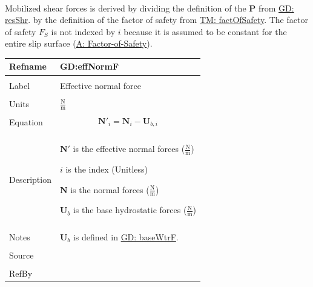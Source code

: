 \documentclass[12pt]{article}
\begin{document}
\paragraph{}
\label{GD:mobShrDeriv}
Mobilized shear forces is derived by dividing the definition of the $\mathbf{P}$ from \hyperref[GD:resShr]{GD: resShr}. by the definition of the factor of safety from \hyperref[TM:factOfSafety]{TM: factOfSafety}. The factor of safety ${F_{S}}$ is not indexed by $i$ because it is assumed to be constant for the entire slip surface (\hyperref[assumpFOS]{A: Factor-of-Safety}).

\vspace{\baselineskip}
\noindent
\begin{minipage}{\textwidth}
\begin{tabular}{>{\raggedright}p{}>{\raggedright\arraybackslash}p{}}
\toprule \textbf{Refname} & \textbf{GD:effNormF}
\label{GD:effNormF}
\\ \midrule \\
Label & Effective normal force
        
\\ \midrule \\
Units & $\frac{\text{N}}{\text{m}}$
        
\\ \midrule \\
Equation & \begin{displaymath}
           {\mathbf{N'}}_{i}={\mathbf{N}}_{i}-{\mathbf{U}_{b,i}}
           \end{displaymath}
\\ \midrule \\
Description & \begin{symbDescription}
              \item{$\mathbf{N'}$ is the effective normal forces ($\frac{\text{N}}{\text{m}}$)}
              \item{$i$ is the index (Unitless)}
              \item{$\mathbf{N}$ is the normal forces ($\frac{\text{N}}{\text{m}}$)}
              \item{${\mathbf{U}_{b}}$ is the base hydrostatic forces ($\frac{\text{N}}{\text{m}}$)}
              \end{symbDescription}
\\ \midrule \\
Notes & ${\mathbf{U}_{b}}$ is defined in \hyperref[GD:baseWtrF]{GD: baseWtrF}.
        
\\ \midrule \\
Source & \cite{chen2005}
         
\\ \midrule \\
RefBy & 
\\ \bottomrule
\end{tabular}
\end{minipage}
\end{document}
